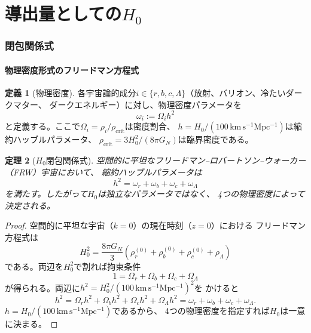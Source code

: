 \documentclass[12pt]{article}
\theoremstyle{plain}
\newtheorem{theorem}{定理}[section]
\theoremstyle{definition}
\newtheorem{definition}[theorem]{定義}
\numberwithin{equation}{section}
\newcommand{\crit}{\mathrm{crit}}
\begin{document}
\part{導出量としての$H_0$}

\section{閉包関係式}\label{sec:closure}

\subsection{物理密度形式のフリードマン方程式}

\begin{definition}[物理密度]
各宇宙論的成分$i\in\{r,b,c,\Lambda\}$（放射、バリオン、冷たいダークマター、
ダークエネルギー）に対し、物理密度パラメータを
\begin{equation}
\omega_i := \Omega_i h^2
\end{equation}
と定義する。ここで$\Omega_i=\rho_i/\rho_{\crit}$は密度割合、
$h=H_0/(100\,\mathrm{km\,s^{-1}Mpc^{-1}})$は縮約ハッブルパラメータ、
$\rho_{\crit}=3H_0^2/(8\pi G_N)$は臨界密度である。
\end{definition}

\begin{theorem}[$H_0$閉包関係式]\label{thm:closure}
空間的に平坦なフリードマン--ロバートソン--ウォーカー（FRW）宇宙において、
縮約ハッブルパラメータは
\begin{equation}\label{eq:closure}
\boxed{h^2 = \omega_r + \omega_b + \omega_c + \omega_\Lambda}
\end{equation}
を満たす。したがって$H_0$は独立なパラメータではなく、
4つの物理密度によって決定される。
\end{theorem}

\begin{proof}
空間的に平坦な宇宙（$k=0$）の現在時刻（$z=0$）における
フリードマン方程式は
\begin{equation}
H_0^2 = \frac{8\pi G_N}{3}\left(\rho_r^{(0)}+\rho_b^{(0)}+\rho_c^{(0)}+\rho_\Lambda\right)
\end{equation}
である。両辺を$H_0^2$で割れば拘束条件
\begin{equation}
1 = \Omega_r + \Omega_b + \Omega_c + \Omega_\Lambda
\end{equation}
が得られる。両辺に$h^2=H_0^2/(100\,\mathrm{km\,s^{-1}Mpc^{-1}})^2$を
かけると
\begin{equation}
h^2 = \Omega_r h^2 + \Omega_b h^2 + \Omega_c h^2 + \Omega_\Lambda h^2
    = \omega_r + \omega_b + \omega_c + \omega_\Lambda.
\end{equation}
$h=H_0/(100\,\mathrm{km\,s^{-1}Mpc^{-1}})$であるから、
4つの物理密度を指定すれば$H_0$は一意に決まる。
\end{proof}
\end{document}
